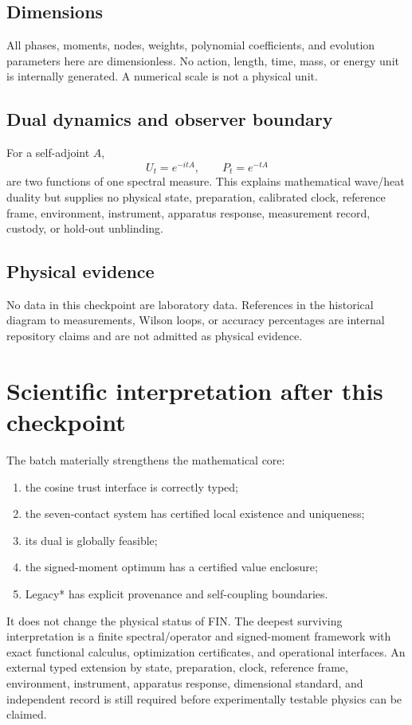 \documentclass[11pt,a4paper]{article}
\begin{document}
\subsection{Dimensions}
All phases, moments, nodes, weights, polynomial coefficients, and evolution
parameters here are dimensionless. No action, length, time, mass, or energy
unit is internally generated. A numerical scale is not a physical unit.

\subsection{Dual dynamics and observer boundary}
For a self-adjoint $A$,
\[
U_t=e^{-itA},\qquad P_t=e^{-tA}
\]
are two functions of one spectral measure. This explains mathematical
wave/heat duality but supplies no physical state, preparation, calibrated
clock, reference frame, environment, instrument, apparatus response,
measurement record, custody, or hold-out unblinding.

\subsection{Physical evidence}
No data in this checkpoint are laboratory data. References in the historical
diagram to measurements, Wilson loops, or accuracy percentages are internal
repository claims and are not admitted as physical evidence.

\section{Scientific interpretation after this checkpoint}

The batch materially strengthens the mathematical core:
\begin{enumerate}
\item the cosine trust interface is correctly typed;
\item the seven-contact system has certified local existence and uniqueness;
\item its dual is globally feasible;
\item the signed-moment optimum has a certified value enclosure;
\item Legacy* has explicit provenance and self-coupling boundaries.
\end{enumerate}

It does not change the physical status of FIN. The deepest surviving
interpretation is a finite spectral/operator and signed-moment framework with
exact functional calculus, optimization certificates, and operational
interfaces. An external typed extension by state, preparation, clock,
reference frame, environment, instrument, apparatus response, dimensional
standard, and independent record is still required before experimentally
testable physics can be claimed.
\end{document}
